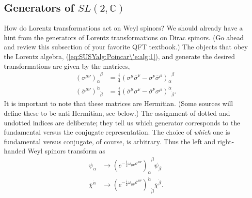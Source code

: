 \documentclass[12pt, oneside]{report}    %
\begin{document}
\subsection{\texorpdfstring{Generators of $SL(2,\mathbb{C})$}{Generators of SL(2,C)}}


How do Lorentz transformations act on Weyl spinors? We should already have a hint from the generators of Lorentz transformations on Dirac spinors. (Go ahead and review this subsection of your favorite QFT textbook.) The objects that obey the Lorentz algebra,  (\ref{eq:SUSYalg:Poincar\'e:alg:1}), and generate the desired transformations are given by the matrices,
\begin{align}
    (\sigma^{\mu\nu})_\alpha^{\phantom\alpha\beta} &= \frac i4(\sigma^\mu\overline\sigma^\nu-\sigma^\nu\overline\sigma^\mu)_\alpha^{\phantom\alpha\beta}\label{eq:SUSYalg:sigmamunu}\\
    (\overline\sigma^{\mu\nu})^{\dot\alpha}_{\phantom{\dot\alpha}\dot\beta} &= \frac i4 (\overline \sigma^\mu\sigma^\nu - \overline\sigma^\nu\sigma^\mu)^{\dot\alpha}_{\phantom{\dot\alpha}\dot\beta}\label{eq:SUSYalg:sigmabarmunu}.
\end{align}
It is important to note that these matrices are Hermitian. (Some sources will define these to be anti-Hermitian, see below.) The assignment of dotted and undotted indices are deliberate; they tell us which generator corresponds to the fundamental versus the conjugate representation. The choice of \emph{which} one is fundamental versus conjugate, of course, is arbitrary. 
Thus the left and right-handed Weyl spinors transform as
\begin{align}
    \psi_\alpha &\rightarrow \left(e^{-\frac i2 \omega_{\mu\nu}\sigma^{\mu\nu}}\right)_\alpha^{\phantom\alpha\beta}\psi_\beta\label{eq:SUSYalg:alphatransform}\\
    \overline\chi^{\dot\alpha} &\rightarrow \left(e^{-\frac i2 \omega_{\mu\nu}\overline\sigma^{\mu\nu}}\right)^{\dot\alpha}_{\phantom\alpha\dot\beta}\overline\chi^{\dot\beta}.\label{eq:SUSYalg:alphadottransform}
\end{align}
\end{document}
